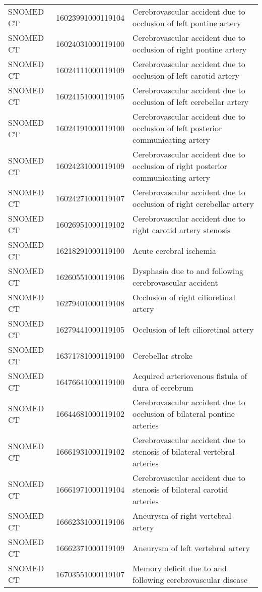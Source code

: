 \begin{longtable}{p{}p{}p{}}
  SNOMED CT & 16023991000119104 & Cerebrovascular accident due to occlusion of left pontine artery \\ 
  SNOMED CT & 16024031000119100 & Cerebrovascular accident due to occlusion of right pontine artery \\ 
  SNOMED CT & 16024111000119109 & Cerebrovascular accident due to occlusion of left carotid artery \\ 
  SNOMED CT & 16024151000119105 & Cerebrovascular accident due to occlusion of left cerebellar artery \\ 
  SNOMED CT & 16024191000119100 & Cerebrovascular accident due to occlusion of left posterior communicating artery \\ 
  SNOMED CT & 16024231000119109 & Cerebrovascular accident due to occlusion of right posterior communicating artery \\ 
  SNOMED CT & 16024271000119107 & Cerebrovascular accident due to occlusion of right cerebellar artery \\ 
  SNOMED CT & 16026951000119102 & Cerebrovascular accident due to right carotid artery stenosis \\ 
  SNOMED CT & 16218291000119100 & Acute cerebral ischemia \\ 
  SNOMED CT & 16260551000119106 & Dysphasia due to and following cerebrovascular accident \\ 
  SNOMED CT & 16279401000119108 & Occlusion of right cilioretinal artery \\ 
  SNOMED CT & 16279441000119105 & Occlusion of left cilioretinal artery \\ 
  SNOMED CT & 16371781000119100 & Cerebellar stroke \\ 
  SNOMED CT & 16476641000119100 & Acquired arteriovenous fistula of dura of cerebrum \\ 
  SNOMED CT & 16644681000119102 & Cerebrovascular accident due to occlusion of bilateral pontine arteries \\ 
  SNOMED CT & 16661931000119102 & Cerebrovascular accident due to stenosis of bilateral vertebral arteries \\ 
  SNOMED CT & 16661971000119104 & Cerebrovascular accident due to stenosis of bilateral carotid arteries \\ 
  SNOMED CT & 16662331000119106 & Aneurysm of right vertebral artery \\ 
  SNOMED CT & 16662371000119109 & Aneurysm of left vertebral artery \\ 
  SNOMED CT & 16703551000119107 & Memory deficit due to and following cerebrovascular disease \\ 

\end{longtable}
